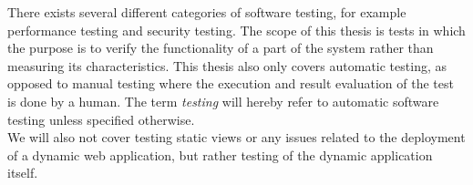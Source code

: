There exists several different categories of software testing, for
example performance testing and security testing. The scope of this
thesis is tests in which the purpose is to verify the functionality of a
part of the system rather than measuring its characteristics. This thesis
also only covers automatic testing, as opposed to manual testing where
the execution and result evaluation of the test is done by a human. The
term \emph{testing} will hereby refer to automatic software testing
unless specified otherwise.\\

We will also not cover testing static views or any issues related to the
deployment of a dynamic web application, but rather testing of the
dynamic application itself.
